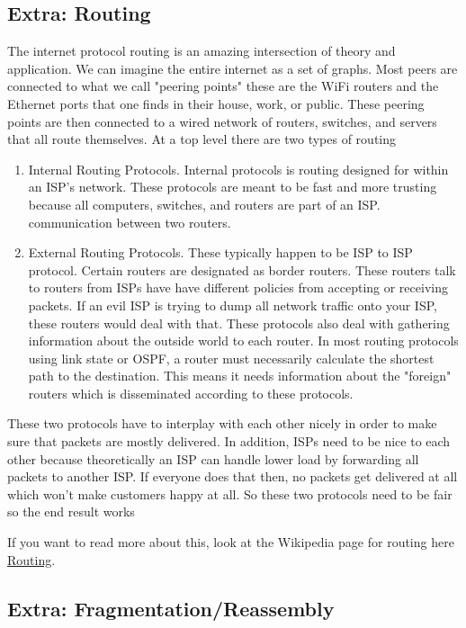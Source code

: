 \subsection{Extra: Routing}

The internet protocol routing is an amazing intersection of theory and application.
We can imagine the entire internet as a set of graphs.
Most peers are connected to what we call "peering points" these are the WiFi routers and the Ethernet ports that one finds in their house, work, or public.
These peering points are then connected to a wired network of routers, switches, and servers that all route themselves.
At a top level there are two types of routing

\begin{enumerate}
\item Internal Routing Protocols.
  Internal protocols is routing designed for within an ISP's network.
  These protocols are meant to be fast and more trusting because all computers, switches, and routers are part of an ISP.
  communication between two routers.
\item External Routing Protocols.
  These typically happen to be ISP to ISP protocol.
  Certain routers are designated as border routers.
  These routers talk to routers from ISPs have have different policies from accepting or receiving packets.
  If an evil ISP is trying to dump all network traffic onto your ISP, these routers would deal with that.
  These protocols also deal with gathering information about the outside world to each router.
  In most routing protocols using link state or OSPF, a router must necessarily calculate the shortest path to the destination.
  This means it needs information about the "foreign" routers which is disseminated according to these protocols.
\end{enumerate}

These two protocols have to interplay with each other nicely in order to make sure that packets are mostly delivered.
In addition, ISPs need to be nice to each other because theoretically an ISP can handle lower load by forwarding all packets to another ISP.
If everyone does that then, no packets get delivered at all which won't make customers happy at all.
So these two protocols need to be fair so the end result works

If you want to read more about this, look at the Wikipedia page for routing here \href{https://en.wikipedia.org/wiki/Routing}{Routing}.

\subsection{Extra: Fragmentation/Reassembly}

